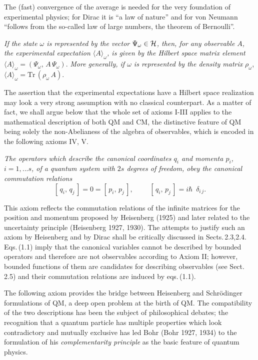 \documentclass[12pt]{article}
\newtheorem{Definition}[Theorem]{Definition}
\def \lan   {\langle}
\def \ran   {\rangle}
\def \be {\begin{equation}}
\def \ee {\end{equation}}
\def \om {{\omega}}
\def \H {\mbox{${\cal H}$}}
\begin{document}
The (fast) convergence of the average is needed for the very foundation of experimental physics; for Dirac it is  ``a law of nature'' and for von Neumann ``follows from the so-called law of large numbers, the theorem of Bernoulli''.





\vspace{1mm}  {\em If the state $\omega$ is represented by the vector $\Psi_\om \in \H$, then,   for any observable $A$,  the experimental expectation $ \lan A \ran_\omega$,   is given by the Hilbert space matrix element} 
$ \lan A \ran_\omega =  (\Psi_\om, \,A\,\Psi_\om)$. {\em More generally, if $\om$ is represented by the density matrix} $\rho_\om$,  $ \lan A \ran_\omega =  \mbox{Tr}\,(\rho_\om \,A).$   
 
The assertion that the experimental expectations have a Hilbert space realization may look a very strong assumption with no classical counterpart. As  a matter of fact, we shall argue below that  the whole set of axioms I-III applies to the mathematical description of both  QM and CM, the distinctive feature  of QM being solely the non-Abelianess of the algebra of observables, which is encoded in the following axioms IV, V.

\vspace{1mm}  {\em The operators which describe the  canonical coordinates $q_i$ and momenta $p_i$, $i = 1,...s$, of a quantum system with $2 s $ degrees of freedom, obey the  canonical commutation relations} \be{[\,q_i, \,q_j\,] = 0 =[\,p_i,\, p_j\,],\,\,\,\,\,\,\,\,\,\,\,\,\,\,[\,q_i, \,p_j\,] =  i \hbar \,\,\, \delta_{i\,j}.}\ee 

This axiom reflects the commutation relations of the infinite matrices for the position and momentum proposed  by Heisenberg (1925) and later related  to the uncertainty principle (Heisenberg 1927, 1930).
The attempts to justify such an axiom by Heisenberg and by Dirac shall be critically discussed in Sects.\,2.3,2.4.
Eqs.\,(1.1) imply that the canonical variables cannot be described by bounded operators and therefore are not observables according to Axiom II; however, bounded functions of them are candidates for describing observables (see Sect.\,2.5) and their  commutation relations are induced by eqs.\,(1.1). 
  
  
The following  axiom provides the bridge between Heisenberg and Schr\"{o}\-dinger formulations of QM, a deep open problem at the birth of QM.
The compatibility of the two  descriptions has been the subject of philosophical debates; the recognition that a quantum particle has multiple properties which look contradictory and mutually exclusive has led Bohr (Bohr 1927, 1934) to the formulation of his {\em complementarity principle} as the basic feature of  quantum physics.  
\end{document}
